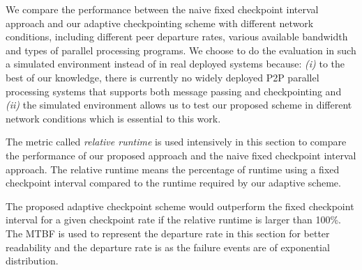 \documentclass[times, 12pt, onecolumn]{article}
\begin{document}
We compare the performance between the naive fixed checkpoint interval approach
and our adaptive checkpointing scheme with different network conditions,
including different peer departure rates, various available bandwidth and types
of parallel processing programs. We choose to do the evaluation in such a
simulated environment instead of in real deployed systems because: \emph{(i)}
to the best of our knowledge, there is currently no widely deployed P2P
parallel processing systems that supports both message passing and
checkpointing and \emph{(ii)} the simulated environment allows us to test our
proposed scheme in different network conditions which is essential to this
work. 

The metric called \emph{relative runtime} is used intensively in this section to compare the performance of our 
proposed approach and the naive fixed checkpoint interval approach. The relative runtime means the percentage of 
runtime using a fixed checkpoint interval compared to the runtime required by our adaptive scheme. 



The proposed adaptive checkpoint scheme would outperform the fixed checkpoint interval for a given checkpoint rate if the relative 
runtime is larger than 100\%. The MTBF is used to represent the departure rate in this section for better readability 
and the departure rate is  as the failure events are of exponential distribution.   
\end{document}
